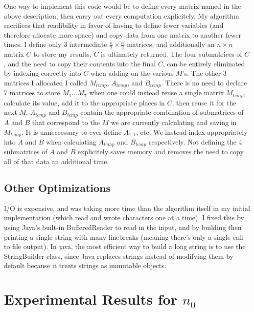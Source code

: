 \documentclass{article}
\begin{document}
One way to implement this code would be to define every matrix named in the above description, then carry out every computation explicitely. My algorithm sacrifices that readibility in favor of having to define fewer variables (and therefore allocate more space) and copy data from one matrix to another fewer times. I define only 3 intermediate $\frac{n}{2} \times \frac{n}{2}$ matrices, and additionally an $n \times n$ matrix $C$ to store my results. $C$ is ultimately returned. The four submatrices of $C$, and the need to copy their contents into the final $C$, can be entirely eliminated by indexing correctly into $C$ when adding on the various $M$'s.  The other 3 matrices I allocated I called $M_{temp}$, $A_{temp}$, and $B_{temp}$. There is no need to declare 7 matrices to store $M_1 ... M_7$ when one could instead reuse a single matrix $M_{temp}$, calculate its value, add it to the appropriate places in $C$, then reuse it for the next $M$. $A_{temp}$ and $B_{temp}$ contain the appropriate combination of submatrices of $A$ and $B$ that correspond to the $M$ we are currently calculating and saving in $M_{temp}$. It is unneccessary to ever define $A_{1, 1}$, etc. We instead index appropriately into $A$ and $B$ when calculating $A_{temp}$ and $B_{temp}$ respectively. Not defining the 4 submatrices of $A$ and $B$ explicitely saves memory and removes the need to copy all of that data an additional time. 

\subsection*{Other Optimizations}
I/O is expensive, and was taking more time than the algorithm itself in my initial implementation (which read and wrote characters one at a time). I fixed this by using Java's built-in BufferedReader to read in the input, and by building then printing a single string with many linebreaks (meaning there's only a single call to file output). In java, the most efficient way to build a long string is to use the StringBuilder class, since Java replaces strings instead of modifying them by default because it treats strings as immutable objects. 


\section*{Experimental Results for $n_0$}
\end{document}
